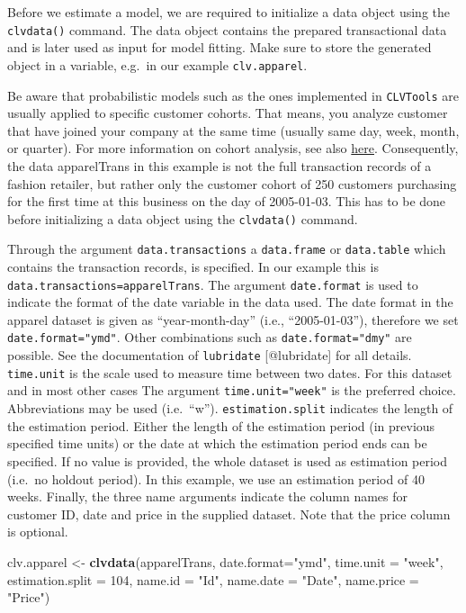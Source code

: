 \documentclass[
]{article}
\newenvironment{Shaded}{\begin{snugshade}}{\end{snugshade}}
\newcommand{\AttributeTok}[1]{\textcolor[rgb]{0.13,0.29,0.53}{#1}}
\newcommand{\DecValTok}[1]{\textcolor[rgb]{0.00,0.00,0.81}{#1}}
\newcommand{\FunctionTok}[1]{\textcolor[rgb]{0.13,0.29,0.53}{\textbf{#1}}}
\newcommand{\NormalTok}[1]{#1}
\newcommand{\OtherTok}[1]{\textcolor[rgb]{0.56,0.35,0.01}{#1}}
\newcommand{\StringTok}[1]{\textcolor[rgb]{0.31,0.60,0.02}{#1}}
\begin{document}
Before we estimate a model, we are required to initialize a data object
using the \texttt{clvdata()} command. The data object contains the
prepared transactional data and is later used as input for model
fitting. Make sure to store the generated object in a variable, e.g.~in
our example \texttt{clv.apparel}.

Be aware that probabilistic models such as the ones implemented in
\texttt{CLVTools} are usually applied to specific customer cohorts. That
means, you analyze customer that have joined your company at the same
time (usually same day, week, month, or quarter). For more information
on cohort analysis, see also
\href{https://en.wikipedia.org/wiki/Cohort_analysis}{here}.
Consequently, the data apparelTrans in this example is not the full
transaction records of a fashion retailer, but rather only the customer
cohort of 250 customers purchasing for the first time at this business
on the day of 2005-01-03. This has to be done before initializing a data
object using the \texttt{clvdata()} command.

Through the argument \texttt{data.transactions} a \texttt{data.frame} or
\texttt{data.table} which contains the transaction records, is
specified. In our example this is
\texttt{data.transactions=apparelTrans}. The argument
\texttt{date.format} is used to indicate the format of the date variable
in the data used. The date format in the apparel dataset is given as
``year-month-day'' (i.e., ``2005-01-03''), therefore we set
\texttt{date.format="ymd"}. Other combinations such as
\texttt{date.format="dmy"} are possible. See the documentation of
\texttt{lubridate} {[}@lubridate{]} for all details. \texttt{time.unit}
is the scale used to measure time between two dates. For this dataset
and in most other cases The argument \texttt{time.unit="week"} is the
preferred choice. Abbreviations may be used (i.e.~``w'').
\texttt{estimation.split} indicates the length of the estimation period.
Either the length of the estimation period (in previous specified time
units) or the date at which the estimation period ends can be specified.
If no value is provided, the whole dataset is used as estimation period
(i.e.~no holdout period). In this example, we use an estimation period
of 40 weeks. Finally, the three name arguments indicate the column names
for customer ID, date and price in the supplied dataset. Note that the
price column is optional.

\begin{Shaded}
\begin{Highlighting}[]
\NormalTok{clv.apparel }\OtherTok{\textless{}{-}} \FunctionTok{clvdata}\NormalTok{(apparelTrans,  }
                       \AttributeTok{date.format=}\StringTok{"ymd"}\NormalTok{, }
                       \AttributeTok{time.unit =} \StringTok{"week"}\NormalTok{,}
                       \AttributeTok{estimation.split =} \DecValTok{104}\NormalTok{,}
                       \AttributeTok{name.id =} \StringTok{"Id"}\NormalTok{,}
                       \AttributeTok{name.date =} \StringTok{"Date"}\NormalTok{,}
                       \AttributeTok{name.price =} \StringTok{"Price"}\NormalTok{)}
\end{Highlighting}
\end{Shaded}
\end{document}

